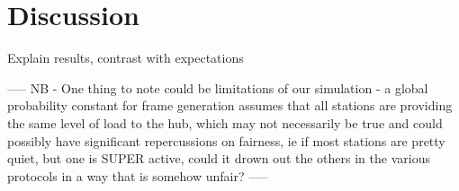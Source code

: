 \documentclass[twocolumn]{article}
\begin{document}
%
%


\section*{Discussion}

Explain results, contrast with expectations

-----
NB -
One thing to note could be limitations of our simulation - a global probability constant 
for frame generation assumes that all stations are providing the same level of load to 
the hub, which may not necessarily be true and could possibly have significant
repercussions on fairness, ie if most stations are pretty quiet, but one is SUPER active,
could it drown out the others in the various protocols in a way that is somehow unfair?
-----
\end{document}
